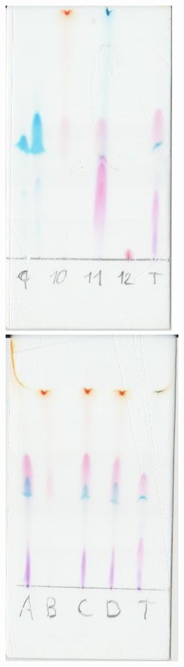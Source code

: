 \documentclass[11pt,paper=a4,final]{scrartcl}
\begin{document}
\begin{figure}[h!]
  \includegraphics{9-12}
  \includegraphics{a-d}

\end{figure}
\end{document}
